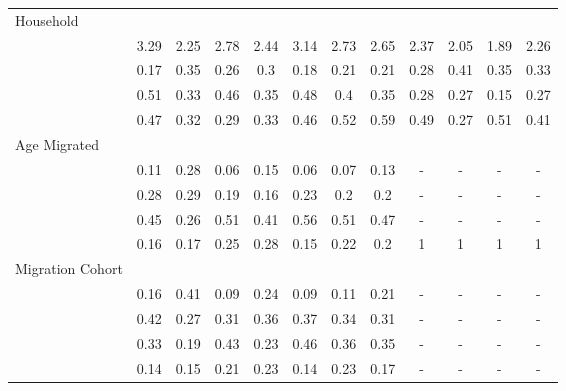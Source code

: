 \documentclass[
]{article}
\begin{document}
\begin{landscape}
\begin{table}[ht]
\begin{tabular}{>{\raggedright\arraybackslash}p{3.2cm}|lcccccc|cccc}
  Household &  &  &  &  &  &  &  &  &  &  &  \\ 
  \multicolumn{1}{>{\raggedleft\arraybackslash}p{2.7cm}|}{\makebox[2.7cm][r]{Household Size }}& 3.29 & 2.25 & 2.78 & 2.44 & 3.14 & 2.73 & 2.65 & 2.37 & 2.05 & 1.89 & 2.26 \\ 
  \multicolumn{1}{>{\raggedleft\arraybackslash}p{2.2cm}|}{\makebox[2.2cm][r]{Lives Alone }}& 0.17 & 0.35 & 0.26 & 0.3 & 0.18 & 0.21 & 0.21 & 0.28 & 0.41 & 0.35 & 0.33 \\ 
  \multicolumn{1}{>{\raggedleft\arraybackslash}p{2.9cm}|}{\makebox[2.9cm][r]{Lives with Child }}& 0.51 & 0.33 & 0.46 & 0.35 & 0.48 & 0.4 & 0.35 & 0.28 & 0.27 & 0.15 & 0.27 \\ 
  \multicolumn{1}{>{\raggedleft\arraybackslash}p{3.4cm}|}{\makebox[3.4cm][r]{Married/Cohabiting }}& 0.47 & 0.32 & 0.29 & 0.33 & 0.46 & 0.52 & 0.59 & 0.49 & 0.27 & 0.51 & 0.41 \\ 
  Age Migrated &  &  &  &  &  &  &  &  &  &  &  \\ 
  \multicolumn{1}{>{\raggedleft\arraybackslash}p{2.4cm}|}{\makebox[2.4cm][r]{Less than 15 }}& 0.11 & 0.28 & 0.06 & 0.15 & 0.06 & 0.07 & 0.13 & - & - & - & - \\ 
  \multicolumn{1}{>{\raggedleft\arraybackslash}p{1.6cm}|}{\makebox[1.6cm][r]{15 - 23 }}& 0.28 & 0.29 & 0.19 & 0.16 & 0.23 & 0.2 & 0.2 & - & - & - & - \\ 
  \multicolumn{1}{>{\raggedleft\arraybackslash}p{1.6cm}|}{\makebox[1.6cm][r]{24 - 49 }}& 0.45 & 0.26 & 0.51 & 0.41 & 0.56 & 0.51 & 0.47 & - & - & - & - \\ 
  \multicolumn{1}{>{\raggedleft\arraybackslash}p{2.6cm}|}{\makebox[2.6cm][r]{50 and Above }}& 0.16 & 0.17 & 0.25 & 0.28 & 0.15 & 0.22 & 0.2 & 1 & 1 & 1 & 1 \\ 
  Migration Cohort &  &  &  &  &  &  &  &  &  &  &  \\ 
  \multicolumn{1}{>{\raggedleft\arraybackslash}p{2.3cm}|}{\makebox[2.3cm][r]{Before 1965 }}& 0.16 & 0.41 & 0.09 & 0.24 & 0.09 & 0.11 & 0.21 & - & - & - & - \\ 
  \multicolumn{1}{>{\raggedleft\arraybackslash}p{2.2cm}|}{\makebox[2.2cm][r]{1965 - 1979 }}& 0.42 & 0.27 & 0.31 & 0.36 & 0.37 & 0.34 & 0.31 & - & - & - & - \\ 
  \multicolumn{1}{>{\raggedleft\arraybackslash}p{2.2cm}|}{\makebox[2.2cm][r]{1980 - 1999 }}& 0.33 & 0.19 & 0.43 & 0.23 & 0.46 & 0.36 & 0.35 & - & - & - & - \\ 
  \multicolumn{1}{>{\raggedleft\arraybackslash}p{2.1cm}|}{\makebox[2.1cm][r]{After 1999 }}& 0.14 & 0.15 & 0.21 & 0.23 & 0.14 & 0.23 & 0.17 & - & - & - & - \\ 

\end{tabular}
\end{table}
\end{landscape}
\end{document}
